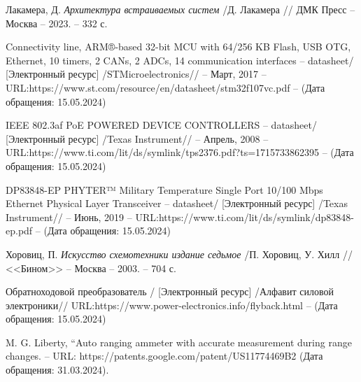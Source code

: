 \begin{thebibliography}{00}


 Лакамера, Д.
\emph{Архитектура встраиваемых систем} /Д. Лакамера // ДМК Пресс --
Москва -- 2023. -- 332 с.

 Connectivity line, ARM®-based 32-bit MCU with 64/256 KB Flash,
 USB OTG, Ethernet, 10 timers, 2 CANs, 2 ADCs, 14 communication interfaces -- datasheet/
  [Электронный ресурс]
 /STMicroelectronics// -- Март, 2017 -- 
 URL:https://www.st.com/resource/en/datasheet/stm32f107vc.pdf --
 (Дата обращения: 15.05.2024)

 IEEE 802.3af PoE POWERED DEVICE CONTROLLERS -- datasheet/
  [Электронный ресурс] /Texas Instrument// -- Апрель, 2008 
  -- URL:https://www.ti.com/lit/ds/symlink/tps2376.pdf?ts=1715733862395 --
  (Дата обращения: 15.05.2024)

 DP83848-EP PHYTER™ Military Temperature Single Port
   10/100 Mbps Ethernet
  Physical Layer Transceiver -- datasheet/
  [Электронный ресурс] /Texas Instrument// -- Июнь, 2019 
  -- URL:https://www.ti.com/lit/ds/symlink/dp83848-ep.pdf --
  (Дата обращения: 15.05.2024)

 Хоровиц, П.
\emph{Искусство схемотехники издание седьмое} /П. Хоровиц, У. Хилл // <<Бином>> --
Москва -- 2003. -- 704 с.

 Обратноходовой преобразователь /
  [Электронный ресурс] /Алфавит силовой электроники// 
   URL:https://www.power-electronics.info/flyback.html --
  (Дата обращения: 15.05.2024)

 M. G. Liberty, “Auto ranging ammeter with accurate measurement 
during range changes. -- URL:
https://patents.google.com/patent/US11774469B2 (Дата обращения: 31.03.2024).

\end{thebibliography}

